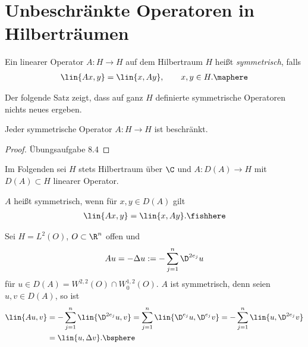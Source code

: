 \chapter{Unbeschränkte Operatoren in Hilberträumen}

\begin{bemn}[Erinnerung.]
Ein linearer Operator $A: H\to H$ auf dem Hilbertraum $H$ heißt
\emph{symmetrisch}, falls
\begin{align*}
\lin{Ax,y} = \lin{x,Ay},\qquad x,y\in H.\maphere
\end{align*}
\end{bemn}

Der folgende Satz zeigt, dass auf ganz $H$ definierte symmetrische Operatoren
nichts neues ergeben.

\begin{prop}
\label{prop:8.1}
Jeder symmetrische Operator $A:H\to H$ ist beschränkt.\fishhere
\end{prop}
\begin{proof}
Übungsaufgabe 8.4\qedhere
\end{proof}

\begin{bem}[Vereinbarung.]
\label{bem:8.2}
Im Folgenden sei $H$ stets Hilbertraum über $\C$ und $A: D(A)\to H$ mit
$D(A)\subset H$ linearer Operator.\maphere 
\end{bem}

\begin{defn}
\label{defn:8.3}
$A$ heißt symmetrisch, wenn für $x,y\in D(A)$ gilt
\begin{align*}
\lin{Ax,y} = \lin{x,Ay}.\fishhere
\end{align*}
\end{defn}

\begin{bsp}
\label{bsp:8.4}
Sei $H=L^2(O)$, $O\subset\R^n$ offen und
\begin{align*}
Au = -\Delta u := -\sum_{j=1}^n \D^{2e_j}u
\end{align*}
für $u\in D(A) = W^{2,2}(O)\cap W_0^{1,2}(O)$. $A$ ist symmetrisch, denn
seien $u,v\in D(A)$, so ist
\begin{align*}
\lin{Au,v} &= - \sum_{j=1}^n \lin{\D^{2e_j}u,v}
= \sum_{j=1}^n \lin{\D^{e_j}u,\D^{e_j}v}
= -\sum_{j=1}^n \lin{u,\D^{2e_j}v}\\
&= \lin{u,\Delta v}.\bsphere
\end{align*}
\end{bsp}

